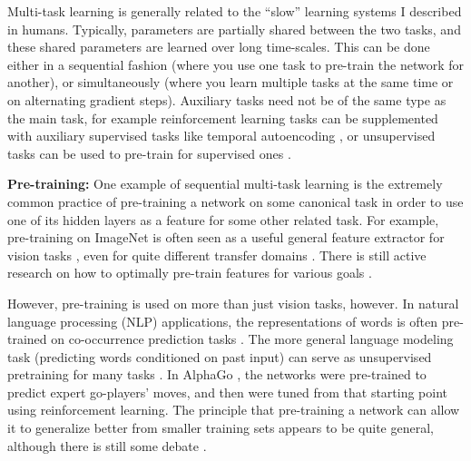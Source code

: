 \documentclass[11pt]{article}
\begin{document}
Multi-task learning is generally related to the ``slow'' learning systems I described in humans. Typically, parameters are partially shared between the two tasks, and these shared parameters are learned over long time-scales. This can be done either in a sequential fashion (where you use one task to pre-train the network for another), or simultaneously (where you learn multiple tasks at the same time or on alternating gradient steps). Auxiliary tasks need not be of the same type as the main task, for example reinforcement learning tasks can be supplemented with auxiliary supervised tasks like temporal autoencoding \citep[e.g.]{Hermann2017}, or unsupervised tasks can be used to pre-train for supervised ones \citep[e.g.]{Wu2018}. \par
\textbf{Pre-training:} One example of sequential multi-task learning is the extremely common practice of pre-training a network on some canonical task in order to use one of its hidden layers as a feature for some other related task. For example, pre-training on ImageNet \citep{Deng2009} is often seen as a useful general feature extractor for vision tasks \citep{Huh2016}, even for quite different transfer domains \citep[e.g.]{Marmanis2016}. There is still active research on how to optimally pre-train features for various goals \citep[e.g.]{Wu2018}. \par    
However, pre-training is used on more than just vision tasks, however. In natural language processing (NLP) applications, the representations of words is often pre-trained on co-occurrence prediction tasks \citep[e.g.]{Pennington2014}. The more general language modeling task (predicting words conditioned on past input) can serve as unsupervised pretraining for many tasks \citep[e.g.]{Radford2019}. In AlphaGo \citep{Silver2016}, the networks were pre-trained to predict expert go-players' moves, and then were tuned from that starting point using reinforcement learning. The principle that pre-training a network can allow it to generalize better from smaller training sets appears to be quite general, although there is still some debate \citep[e.g]{He2018}. \par
\end{document}
